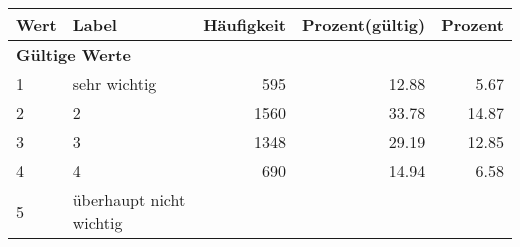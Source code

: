      \begin{longtable}{lXrrr}
     \toprule
     \textbf{Wert} & \textbf{Label} & \textbf{Häufigkeit} & \textbf{Prozent(gültig)} & \textbf{Prozent} \\
     \endhead
     \midrule
     \multicolumn{5}{l}{\textbf{Gültige Werte}}\\

     1 &
     \multicolumn{1}{X}{ sehr wichtig   } &


       \num{595} &
       \num[round-mode=places,round-precision=2]{12.88} &
         \num[round-mode=places,round-precision=2]{5.67} \\

     2 &
     \multicolumn{1}{X}{ 2   } &


       \num{1560} &
       \num[round-mode=places,round-precision=2]{33.78} &
         \num[round-mode=places,round-precision=2]{14.87} \\

     3 &
     \multicolumn{1}{X}{ 3   } &


       \num{1348} &
       \num[round-mode=places,round-precision=2]{29.19} &
         \num[round-mode=places,round-precision=2]{12.85} \\

     4 &
     \multicolumn{1}{X}{ 4   } &


       \num{690} &
       \num[round-mode=places,round-precision=2]{14.94} &
         \num[round-mode=places,round-precision=2]{6.58} \\

     5 &
     \multicolumn{1}{X}{ überhaupt nicht wichtig   } &



\end{longtable}
